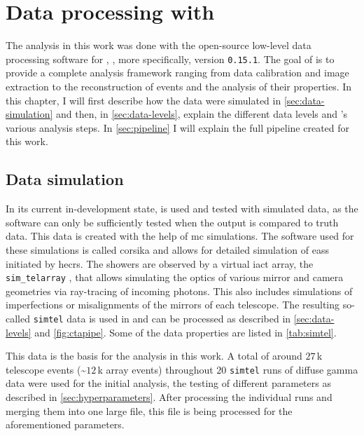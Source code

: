 \chapter{Data processing with \ctapipe{}}
\label{ch:data-processing}

The analysis in this work was done with the open-source low-level data processing software for \cta{},
\ctapipe{} \cite{ctapipe}, more specifically, version \texttt{0.15.1}.
The goal of \ctapipe{} is to provide a complete analysis
framework ranging from data calibration and image extraction to the reconstruction of events and the
analysis of their properties. In this chapter, I will first describe how the data
were simulated in \autoref{sec:data-simulation} and then, in \autoref{sec:data-levels}, explain the different
data levels and \ctapipe{}'s various analysis steps. In \autoref{sec:pipeline} I will
explain the full pipeline created for this work.


\section{Data simulation}
\label{sec:data-simulation}

In its current in-development state, \ctapipe{} is used and tested with simulated data, as the software
can only be sufficiently tested when the output is compared to truth data. This data is created with the help of
\gls{mc} simulations. The software used for these simulations is called \gls{corsika} \cite{corsika} and
allows for detailed simulation of \glspl{eas} initiated by \glspl{hecr}. The showers are observed by
a virtual \gls{iact} array, the \texttt{sim\_telarray} \cite{bernlohr2008}, that allows simulating the optics
of various mirror and camera geometries via ray-tracing of incoming photons. This also includes
simulations of imperfections or misalignments of the mirrors of each telescope. The resulting so-called
\texttt{simtel} data is used in \ctapipe{} and can be processed as described in \autoref{sec:data-levels}
and \autoref{fig:ctapipe}. Some of the data properties are listed in \autoref{tab:simtel}.

This data is the basis for the analysis in this work. A total of around \(\num{27}\)\,k telescope events
(\sim\(\num{12}\)\,k array events) throughout \(\num{20}\) \texttt{simtel} runs of diffuse gamma data
were used for the initial analysis, \ie the testing of different parameters as described in
\autoref{sec:hyperparameters}. After processing the individual runs and merging them into one large
file, this file is being processed for the aforementioned parameters. %

